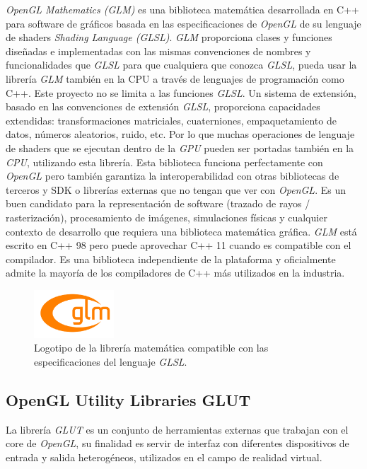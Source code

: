 \documentclass[a4paper]{book}
\begin{document}
\textit{OpenGL Mathematics (GLM)} es una biblioteca matemática desarrollada en C++ para software
de gráficos basada en las especificaciones de \textit{OpenGL} de su lenguaje de shaders \textit{Shading Language (GLSL)}.
\textit{GLM} proporciona clases y funciones diseñadas e implementadas con las mismas convenciones de nombres
y funcionalidades que \textit{GLSL} para que cualquiera que conozca \textit{GLSL}, pueda usar la librería \textit{GLM} también
en la CPU a través de lenguajes de programación como C++. Este proyecto no se limita a las funciones \textit{GLSL}.
Un sistema de extensión, basado en las convenciones de extensión \textit{GLSL}, proporciona capacidades extendidas:
transformaciones matriciales, cuaterniones, empaquetamiento de datos, números aleatorios, ruido, etc. Por lo que muchas
operaciones de lenguaje de shaders que se ejecutan dentro de la \textit{GPU} pueden ser portadas también en la \textit{CPU},
utilizando esta librería. Esta biblioteca funciona perfectamente con \textit{OpenGL} pero también garantiza la interoperabilidad con otras
bibliotecas de terceros y SDK o librerías externas que no tengan que ver con \textit{OpenGL}. Es un buen candidato
para la representación de software (trazado de rayos / rasterización), procesamiento de imágenes,
simulaciones físicas y cualquier contexto de desarrollo que requiera una biblioteca matemática gráfica. \textit{GLM}
está escrito en C++ 98 pero puede aprovechar C++ 11 cuando es compatible con el compilador. Es una
biblioteca independiente de la plataforma y oficialmente admite la mayoría de los compiladores de C++
más utilizados en la industria. \cite{glm:_manual}

\begin{figure}[H]
    \centering
    \includegraphics[width=3cm, keepaspectratio]{img/logo_glm.png}
    \caption{Logotipo de la librería matemática compatible con las especificaciones del lenguaje \textit{GLSL}.}
    \label{logo_glm}
\end{figure}

\subsection{OpenGL Utility Libraries GLUT}
\label{subsec:GLUT}

La librería \textit{GLUT} es un conjunto de herramientas externas que trabajan con el core de \textit{OpenGL},
su finalidad es servir de interfaz con diferentes dispositivos de entrada y salida heterogéneos,
utilizados en el campo de realidad virtual. \cite{glut:docs}
\end{document}
